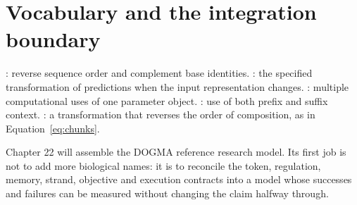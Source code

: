 \clearpage
\section{Vocabulary and the integration boundary}
: reverse sequence order and complement base
identities. : the specified transformation of predictions
when the input representation changes. : multiple
computational uses of one parameter object. : use of
both prefix and suffix context. : a transformation
that reverses the order of composition, as in Equation~\ref{eq:chunks}.

Chapter 22 will assemble the DOGMA reference research model. Its first job is
not to add more biological names: it is to reconcile the token, regulation,
memory, strand, objective and execution contracts into a model whose successes
and failures can be measured without changing the claim halfway through.
